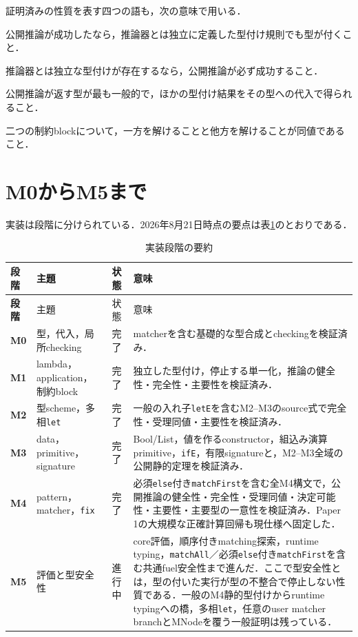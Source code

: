\documentclass[11pt,a4paper,oneside]{ltjsbook}
\newcommand{\code}[1]{\texttt{#1}}
\begin{document}
証明済みの性質を表す四つの語も，次の意味で用いる．

\begin{description}[leftmargin=8em,style=nextline]
  \item[健全性]
    公開推論が成功したなら，推論器とは独立に定義した型付け規則でも型が付くこと．
  \item[完全性]
    推論器とは独立な型付けが存在するなら，公開推論が必ず成功すること．
  \item[主要性]
    公開推論が返す型が最も一般的で，ほかの型付け結果をその型への代入で得られること．
  \item[受理同値]
    二つの制約blockについて，一方を解けることと他方を解けることが同値であること．
\end{description}

\section{M0からM5まで}

実装は段階に分けられている．2026年8月21日時点の要点は表\ref{tab:milestones}のとおりである．

\begin{longtable}{>{\bfseries}p{9mm}p{42mm}p{18mm}p{70mm}}
\caption{実装段階の要約}\label{tab:milestones}\\
\toprule
段階 & 主題 & 状態 & 意味 \\
\midrule
\endfirsthead
\toprule
段階 & 主題 & 状態 & 意味 \\
\midrule
\endhead
M0 & 型，代入，局所checking & 完了 & matcherを含む基礎的な型合成とcheckingを検証済み．\\
M1 & lambda，application，制約block & 完了 & 独立した型付け，停止する単一化，推論の健全性・完全性・主要性を検証済み．\\
M2 & 型scheme，多相\code{let} & 完了 & 一般の入れ子\code{letE}を含むM2--M3のsource式で完全性・受理同値・主要性を検証済み．\\
M3 & data，primitive，signature & 完了 & Bool/List，値を作るconstructor，組込み演算primitive，\code{ifE}，有限signatureと，M2--M3全域の公開静的定理を検証済み．\\
M4 & pattern，matcher，\code{fix} & 完了 & 必須\code{else}付き\code{matchFirst}を含む全M4構文で，公開推論の健全性・完全性・受理同値・決定可能性・主要性・主要型の一意性を検証済み．Paper 1の大規模な正確計算回帰も現仕様へ固定した．\\
M5 & 評価と型安全性 & 進行中 & core評価，順序付きmatching探索，runtime typing，\code{matchAll}／必須\code{else}付き\code{matchFirst}を含む共通fuel安全性まで進んだ．ここで型安全性とは，型の付いた実行が型の不整合で停止しない性質である．一般のM4静的型付けからruntime typingへの橋，多相\code{let}，任意のuser matcher branchとMNodeを覆う一般証明は残っている．\\
\bottomrule
\end{longtable}
\end{document}
